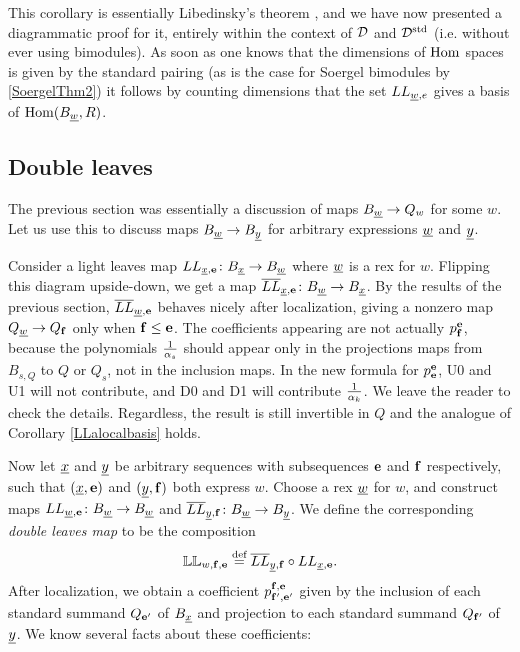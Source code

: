 This corollary is essentially Libedinsky's theorem \cite{Lib}, and we have now presented a diagrammatic proof for it, entirely within the context of ${\mathcal{D}}$ and ${\mathcal{D}}^{\textrm{std}}$ (i.e. without ever
using bimodules). As soon as one knows that the dimensions of $\operatorname{Hom}$ spaces is given by the standard pairing (as is the case for Soergel bimodules by \ref{SoergelThm2}) it follows by counting dimensions that the set $LL_{\underline{w}, e}$ gives a  basis of $\operatorname{Hom}(B_{\underline{w}}, R)$.

\subsection{Double leaves}

The previous section was essentially a discussion of maps $B_{\underline{w}} \rightarrow Q_w$ for some $w$. Let us use this to discuss maps $B_{\underline{w}} \rightarrow B_{\underline{y}}$ for arbitrary expressions ${\underline{w}}$ and ${\underline{y}}$.

Consider a light leaves map $LL_{{\underline{x}},{\mathbf e}} \colon B_{\underline{x}} \rightarrow B_{\underline{w}}$ where ${\underline{w}}$ is a rex for $w$. Flipping this diagram upside-down, we get a map $\overline{LL}_{{\underline{x}},{\mathbf e}} \colon
B_{\underline{w}} \rightarrow B_{\underline{x}}$. By the results of the previous section, $\overline{LL}_{{\underline{w}},{\mathbf e}}$ behaves nicely after localization, giving a nonzero map $Q_{{\underline{w}}} \rightarrow Q_{\mathbf f}$ only when ${\mathbf f}
\le {\mathbf e}$. The coefficients appearing are not actually $p^{\mathbf e}_{\mathbf f}$, because the polynomials $\frac{1}{\alpha_s}$ should appear only in the projections maps from $B_{s,Q}$ to $Q$ or $Q_s$, not
in the inclusion maps. In the new formula for $p^{\mathbf e}_{\mathbf e}$, U0 and U1 will not contribute, and D0 and D1 will contribute $\frac{1}{\alpha_k}$. We leave the reader to check the details.
Regardless, the result is still invertible in $Q$ and the analogue of Corollary \ref{LLalocalbasis} holds.

Now let ${\underline{x}}$ and ${\underline{y}}$ be arbitrary sequences with subsequences ${\mathbf e}$ and ${\mathbf f}$ respectively, such that $({\underline{x}},{\mathbf e})$ and $({\underline{y}},{\mathbf f})$ both express $w$. Choose a rex ${\underline{w}}$ for $w$, and
construct maps $LL_{{\underline{w}},{\mathbf e}} \colon B_{\underline{w}} \rightarrow B_{\underline{w}}$ and $\overline{LL}_{{\underline{y}},{\mathbf f}} \colon B_{\underline{w}} \rightarrow B_{\underline{y}}$. We define the corresponding \emph{double leaves map} to be the composition 
\[
\mathbb{LL}_{w,{\mathbf f},{\mathbf e}} \stackrel{\mbox{\scriptsize{def}}}{=} \overline{LL}_{{\underline{y}},{\mathbf f}} \circ LL_{{\underline{x}},{\mathbf e}}.
\] 
After localization, we obtain a coefficient $p^{{\mathbf f},{\mathbf e}}_{{\mathbf f}',{\mathbf e}'}$ given by the inclusion of each standard summand $Q_{{\mathbf e}'}$ of $B_{\underline{x}}$ and projection to each standard summand $Q_{{\mathbf f}'}$ of ${\underline{y}}$. We know several facts about these coefficients:

